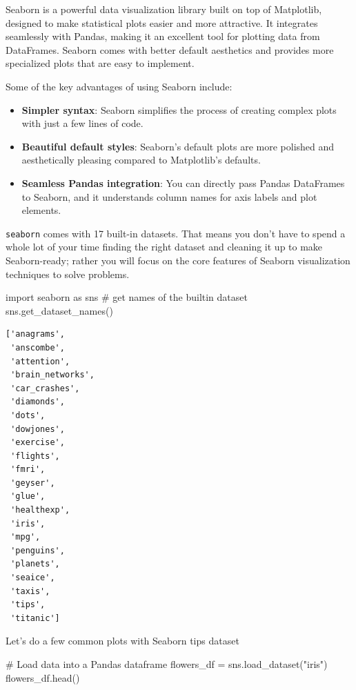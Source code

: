 \documentclass[
  letterpaper,
  DIV=11,
  numbers=noendperiod]{scrreprt}
\newenvironment{Shaded}{\begin{snugshade}}{\end{snugshade}}
\newcommand{\CommentTok}[1]{\textcolor[rgb]{0.37,0.37,0.37}{#1}}
\newcommand{\ImportTok}[1]{\textcolor[rgb]{0.00,0.46,0.62}{#1}}
\newcommand{\NormalTok}[1]{\textcolor[rgb]{0.00,0.23,0.31}{#1}}
\newcommand{\OperatorTok}[1]{\textcolor[rgb]{0.37,0.37,0.37}{#1}}
\newcommand{\StringTok}[1]{\textcolor[rgb]{0.13,0.47,0.30}{#1}}
\providecommand{\tightlist}{%
  \setlength{\itemsep}{0pt}\setlength{\parskip}{0pt}}\usepackage{longtable,booktabs,array}
\begin{document}
Seaborn is a powerful data visualization library built on top of
Matplotlib, designed to make statistical plots easier and more
attractive. It integrates seamlessly with Pandas, making it an excellent
tool for plotting data from DataFrames. Seaborn comes with better
default aesthetics and provides more specialized plots that are easy to
implement.

Some of the key advantages of using Seaborn include:

\begin{itemize}
\tightlist
\item
  \textbf{Simpler syntax}: Seaborn simplifies the process of creating
  complex plots with just a few lines of code.
\item
  \textbf{Beautiful default styles}: Seaborn's default plots are more
  polished and aesthetically pleasing compared to Matplotlib's defaults.
\item
  \textbf{Seamless Pandas integration}: You can directly pass Pandas
  DataFrames to Seaborn, and it understands column names for axis labels
  and plot elements.
\end{itemize}

\texttt{seaborn} comes with 17 built-in datasets. That means you don't
have to spend a whole lot of your time finding the right dataset and
cleaning it up to make Seaborn-ready; rather you will focus on the core
features of Seaborn visualization techniques to solve problems.

\begin{Shaded}
\begin{Highlighting}[]
\ImportTok{import}\NormalTok{ seaborn }\ImportTok{as}\NormalTok{ sns}
\CommentTok{\# get names of the builtin dataset}
\NormalTok{sns.get\_dataset\_names()}
\end{Highlighting}
\end{Shaded}

\begin{verbatim}
['anagrams',
 'anscombe',
 'attention',
 'brain_networks',
 'car_crashes',
 'diamonds',
 'dots',
 'dowjones',
 'exercise',
 'flights',
 'fmri',
 'geyser',
 'glue',
 'healthexp',
 'iris',
 'mpg',
 'penguins',
 'planets',
 'seaice',
 'taxis',
 'tips',
 'titanic']
\end{verbatim}

Let's do a few common plots with Seaborn tips dataset

\begin{Shaded}
\begin{Highlighting}[]
\CommentTok{\# Load data into a Pandas dataframe}
\NormalTok{flowers\_df }\OperatorTok{=}\NormalTok{ sns.load\_dataset(}\StringTok{"iris"}\NormalTok{)}
\NormalTok{flowers\_df.head()}
\end{Highlighting}
\end{Shaded}
\end{document}
